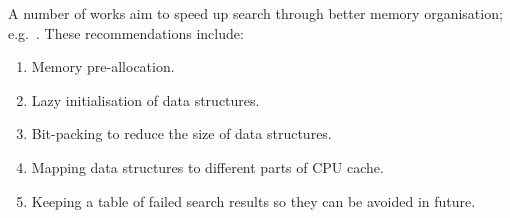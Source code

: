 A number of works aim to speed up search through better memory organisation; 
e.g.~\citep{rabin00,higgins02,cain02,park04,Cazenave:06}. These recommendations include:
\begin{enumerate}
\item Memory pre-allocation.
\item Lazy initialisation of data structures.
\item Bit-packing to reduce the size of data structures.
\item Mapping data structures to different parts of CPU cache.
\item Keeping a table of failed search results so they can be avoided in future.
\end{enumerate}
